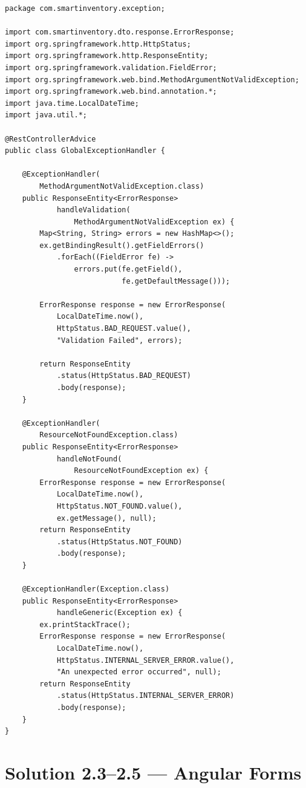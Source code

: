 \documentclass[12pt,a4paper]{report}
\begin{document}
\begin{lstlisting}[style=javastyle, title={exception/GlobalExceptionHandler.java}]
package com.smartinventory.exception;

import com.smartinventory.dto.response.ErrorResponse;
import org.springframework.http.HttpStatus;
import org.springframework.http.ResponseEntity;
import org.springframework.validation.FieldError;
import org.springframework.web.bind.MethodArgumentNotValidException;
import org.springframework.web.bind.annotation.*;
import java.time.LocalDateTime;
import java.util.*;

@RestControllerAdvice
public class GlobalExceptionHandler {

    @ExceptionHandler(
        MethodArgumentNotValidException.class)
    public ResponseEntity<ErrorResponse>
            handleValidation(
                MethodArgumentNotValidException ex) {
        Map<String, String> errors = new HashMap<>();
        ex.getBindingResult().getFieldErrors()
            .forEach((FieldError fe) ->
                errors.put(fe.getField(),
                           fe.getDefaultMessage()));

        ErrorResponse response = new ErrorResponse(
            LocalDateTime.now(),
            HttpStatus.BAD_REQUEST.value(),
            "Validation Failed", errors);

        return ResponseEntity
            .status(HttpStatus.BAD_REQUEST)
            .body(response);
    }

    @ExceptionHandler(
        ResourceNotFoundException.class)
    public ResponseEntity<ErrorResponse>
            handleNotFound(
                ResourceNotFoundException ex) {
        ErrorResponse response = new ErrorResponse(
            LocalDateTime.now(),
            HttpStatus.NOT_FOUND.value(),
            ex.getMessage(), null);
        return ResponseEntity
            .status(HttpStatus.NOT_FOUND)
            .body(response);
    }

    @ExceptionHandler(Exception.class)
    public ResponseEntity<ErrorResponse>
            handleGeneric(Exception ex) {
        ex.printStackTrace();
        ErrorResponse response = new ErrorResponse(
            LocalDateTime.now(),
            HttpStatus.INTERNAL_SERVER_ERROR.value(),
            "An unexpected error occurred", null);
        return ResponseEntity
            .status(HttpStatus.INTERNAL_SERVER_ERROR)
            .body(response);
    }
}
\end{lstlisting}

\section{Solution 2.3--2.5 --- Angular Forms}
\end{document}

